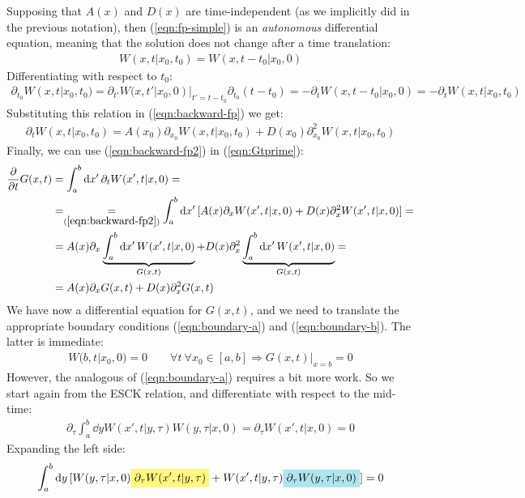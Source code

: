 \documentclass[../template.tex]{subfiles}
\begin{document}
Supposing that $A(x)$ and $D(x)$ are time-independent (as we implicitly did in the previous notation), then (\ref{eqn:fp-simple}) is an \textit{autonomous} differential equation, meaning that the solution does not change after a time translation:
\begin{align*}
    W(x,t|x_0,t_0) = W(x,t-t_0|x_0,0)
\end{align*}  
Differentiating with respect to $t_0$:
\begin{align*}
    \partial_{t_0} W(x,t|x_0,t_0) = \partial_{t'} W(x,t'|x_0,0)|_{t' = t-t_0} \partial_{t_0}(t-t_0) = - \partial_t W(x,t-t_0|x_0,0) = -\partial_t W(x,t|x_0,t_0) 
\end{align*}
Substituting this relation in (\ref{eqn:backward-fp}) we get:
\begin{align}
    \partial_t W(x,t|x_0,t_0) = A(x_0) \partial_{x_0} W(x,t|x_0,t_0) + D(x_0) \partial_{x_0}^2 W(x,t|x_0,t_0) \label{eqn:backward-fp2}
\end{align}
Finally, we can use (\ref{eqn:backward-fp2}) in (\ref{eqn:Gtprime}):
\begin{align}
    \pdv{t}G(x,t) &= \int_a^b \dd{x'} \partial_t W(x',t|x,0) =\\ \nonumber
    &=\underset{(\ref{eqn:backward-fp2})}{=} \int_a^b \dd{x'} [A(x) \partial_x W(x',t|x,0) + D(x) \partial_{x}^2 W(x',t|x,0)] =\\ \nonumber
    &= A(x) \partial_x \underbrace{\int_a^b \dd{x'} W(x',t|x,0)}_{G(x,t)}  + D(x) \partial_{x}^2 \underbrace{\int_a^b \dd{x'} W(x',t|x,0)}_{G(x,t)} =\\
    &= A(x) \partial_x G(x,t) + D(x) \partial_{x}^2 G(x,t) \label{eqn:fpG}
\end{align}
We have now a differential equation for $G(x,t)$, and we need to translate the appropriate boundary conditions (\ref{eqn:boundary-a}) and (\ref{eqn:boundary-b}). The latter is immediate:
\begin{align}
    W(b,t|x_0,0) = 0 \qquad \forall t \> \forall x_0 \in [a,b] \Rightarrow G(x,t)|_{x=b} = 0 \label{eqn:Gboundary-b}
\end{align}
However, the analogous of (\ref{eqn:boundary-a}) requires a bit more work. So we start again from the ESCK relation, and differentiate with respect to the mid-time:
\begin{align*}
    \partial_\tau \int_a^b \dd{y} W(x',t|y, \tau) W(y, \tau|x,0) = \partial_\tau W(x',t|x,0) = 0
\end{align*}
Expanding the left side:
\begin{align*}
    \int_a^b \dd{y} [W(y, \tau|x,0)\hlc{Yellow}{ \partial_\tau W(x',t|y,\tau)} + W(x',t|y,\tau)\hlc{SkyBlue}{\partial_\tau W(y,\tau|x,0)}] = 0
\end{align*}
\end{document}
